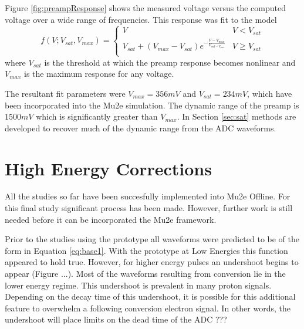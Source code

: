Figure \ref{fig:preampResponse} shows the measured voltage versus the computed voltage over a wide range of frequencies. This response was fit to the model 
\begin{equation}
	f(V; V_{sat}, V_{max}) = \begin{cases} 
		V & V < V_{sat} \\
		V_{sat} + (V_{max} - V_{sat}) e^{-\frac{V - V_{max}}{V_{sat - V_{max}}} } & V \geq V_{sat} \\
		\end{cases} 
\end{equation}
where $V_{sat}$ is the threshold at which the preamp response becomes nonlinear and $V_{max}$ is the maximum response for any voltage. 

The resultant fit parameters were $V_{max} = 356 mV$ and $V_{sat} = 234 mV$, which have been incorporated into the Mu2e simulation. The dynamic range of the preamp is $1500 mV$ which is significantly greater than $V_{max}$. In Section \ref{sec:sat} methods are developed to recover much of the dynamic range from the ADC waveforms. 

\section{High Energy Corrections}

All the studies so far have been succesfully implemented into Mu2e Offline. For this final study significant process has been made. However, further work is still needed before it can be incorporated the Mu2e framework.

Prior to the studies using the prototype all waveforms were predicted to be of the form in Equation \ref{eq:base1}. With the prototype at Low Energies this function appeared to hold true. However, for higher energy pulses an undershoot begins to appear (Figure ...). Most of the waveforms resulting from conversion lie in the lower energy regime. This undershoot is prevalent in many proton signals. Depending on the decay time of this undershoot, it is possible for this additional feature to overwhelm a following conversion electron signal. In other words, the undershoot will place limits on the dead time of the ADC ???

